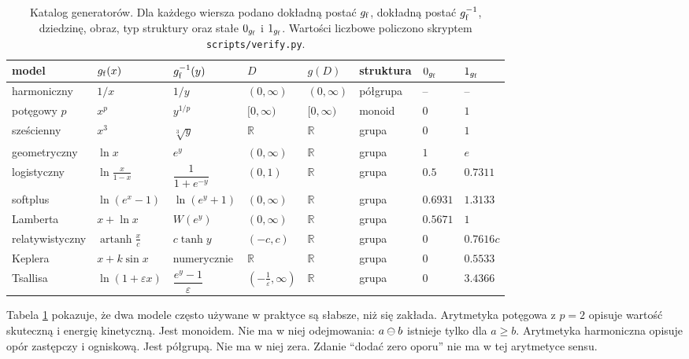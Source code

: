 \documentclass[11pt,a4paper]{article}
\begin{document}
\begin{table}[t]
\centering
\small
\caption{Katalog generatorów. Dla każdego wiersza podano dokładną postać
$g_{\mathrm{f}}$, dokładną postać $g_{\mathrm{f}}^{-1}$, dziedzinę, obraz, typ struktury oraz stałe
$0_{g_{\mathrm{f}}}$ i $1_{g_{\mathrm{f}}}$. Wartości liczbowe policzono skryptem
\texttt{scripts/verify.py}.}
\label{tab:catalogue}
\setlength{\tabcolsep}{4pt}
\begin{tabularx}{\textwidth}{@{}l l l l l l l l@{}}
\toprule
\textbf{model} & $g_{\mathrm{f}}(x)$ & $g_{\mathrm{f}}^{-1}(y)$ & $D$ & $g(D)$ & \textbf{struktura}
& $0_{g_{\mathrm{f}}}$ & $1_{g_{\mathrm{f}}}$ \\
\midrule
harmoniczny & $1/x$ & $1/y$ & $(0,\infty)$ & $(0,\infty)$ & półgrupa & -- & -- \\
potęgowy $p$ & $x^{p}$ & $y^{1/p}$ & $[0,\infty)$ & $[0,\infty)$ & monoid & $0$ & $1$ \\
sześcienny & $x^{3}$ & $\sqrt[3]{y}$ & $\mathbb{R}$ & $\mathbb{R}$ & grupa & $0$ & $1$ \\
geometryczny & $\ln x$ & $e^{y}$ & $(0,\infty)$ & $\mathbb{R}$ & grupa & $1$ & $e$ \\
logistyczny & $\ln\frac{x}{1-x}$ & $\dfrac{1}{1+e^{-y}}$ & $(0,1)$ & $\mathbb{R}$ & grupa & $0.5$ & $0.7311$ \\
softplus & $\ln(e^{x}-1)$ & $\ln(e^{y}+1)$ & $(0,\infty)$ & $\mathbb{R}$ & grupa & $0.6931$ & $1.3133$ \\
Lamberta & $x+\ln x$ & $W(e^{y})$ & $(0,\infty)$ & $\mathbb{R}$ & grupa & $0.5671$ & $1$ \\
relatywistyczny & $\operatorname{artanh}\frac{x}{c}$ & $c\tanh y$
& $(-c,c)$ & $\mathbb{R}$ & grupa & $0$ & $0.7616c$ \\
Keplera & $x+k\sin x$ & numerycznie & $\mathbb{R}$ & $\mathbb{R}$ & grupa
& $0$ & $0.5533$ \\
Tsallisa & $\ln(1+\varepsilon x)$ & $\dfrac{e^{y}-1}{\varepsilon}$
& $(-\tfrac1\varepsilon,\infty)$ & $\mathbb{R}$ & grupa & $0$ & $3.4366$ \\
\bottomrule
\end{tabularx}
\end{table}

Tabela \ref{tab:catalogue} pokazuje, że dwa modele często używane w praktyce są
słabsze, niż się zakłada. Arytmetyka potęgowa z $p=2$ opisuje wartość
skuteczną i energię kinetyczną. Jest monoidem. Nie ma w niej odejmowania:
$a\mathbin{\ominus} b$ istnieje tylko dla $a\ge b$. Arytmetyka harmoniczna opisuje opór
zastępczy i ogniskową. Jest półgrupą. Nie ma w niej zera. Zdanie
\enquote{dodać zero oporu} nie ma w tej arytmetyce sensu.
\end{document}
